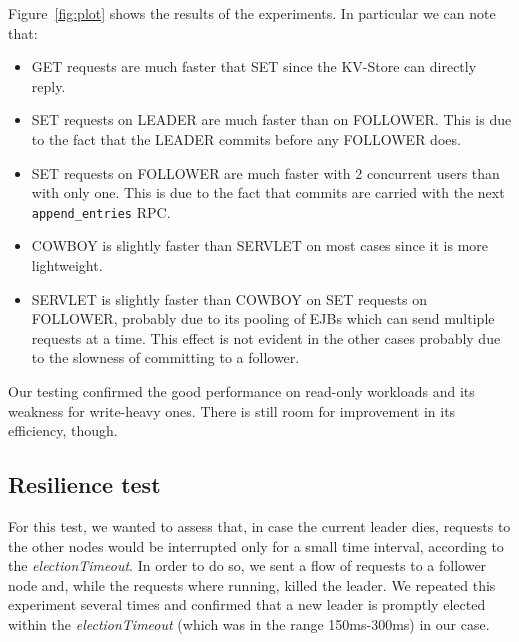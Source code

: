 \documentclass[a4paper]{article}
\begin{document}
Figure~\ref{fig:plot} shows the results of the experiments.  In particular we 
can note that:
\begin{itemize}
    \item GET requests are much faster that SET since the KV-Store can directly
        reply.
    \item SET requests on LEADER are much faster than on FOLLOWER. This is due 
        to the fact that the LEADER commits before any FOLLOWER does.
    \item SET requests on FOLLOWER are much faster with 2 concurrent users than 
        with only one. This is due to the fact that commits are carried with 
        the next \texttt{append\_entries} RPC.
    \item COWBOY is slightly faster than SERVLET on most cases since it is more lightweight.
    \item SERVLET is slightly faster than COWBOY on SET requests on FOLLOWER, probably due to its pooling of EJBs which can send multiple requests at a time. This effect is not evident in the other cases probably due to the slowness of committing to a follower.
\end{itemize}

Our testing confirmed the good performance on read-only workloads and its 
weakness for write-heavy ones. There is still room for improvement in its 
efficiency, though.


\subsection{Resilience test}
For this test, we wanted to assess that, in case the current leader dies, 
requests to the other nodes would be interrupted only for a small time 
interval, according to the \emph{electionTimeout}. In order to do so, we 
sent a flow of requests to a follower node and, while the requests where 
running, killed the leader. We repeated this experiment several times and 
confirmed that a new leader is promptly elected within the 
\emph{electionTimeout} (which was in the range 150ms-300ms) in our case.
\end{document}
